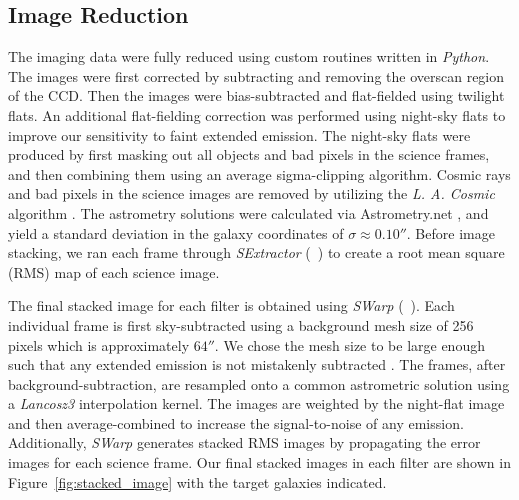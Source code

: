 \documentclass[twocolumn]{aastex62}
\newcommand{\citeth}[1]{(\citeauthor{#1}\ \citeyear{#1})}
\begin{document}
\subsection{Image Reduction}
The imaging data were fully reduced using custom routines written in \emph{Python}. 
The images were first corrected by subtracting and removing the overscan region of the CCD. 
Then the images were bias-subtracted and flat-fielded using twilight flats.
An additional flat-fielding correction was performed using night-sky flats to improve our sensitivity to faint extended emission.  The night-sky flats were produced by first masking out all objects and bad pixels in the science frames, and then combining them using an average sigma-clipping algorithm.
Cosmic rays and bad pixels in the science images are removed by utilizing the \emph{L. A. Cosmic} algorithm \citep{Dokkum2001}.
The astrometry solutions were calculated via Astrometry.net \citep{Lang}, and yield a standard deviation in the galaxy coordinates of $\sigma \approx 0.10''$. Before image stacking, we ran each frame through \emph{SExtractor} \citeth{Bertin} to create a root mean square (RMS) map of each science image.


The final stacked image for each filter is obtained using \emph{SWarp} \citeth{Bertin}.
Each individual frame is first sky-subtracted using a background mesh size of 256 pixels which is approximately $64''$. 
We chose the mesh size to be large enough such that any extended emission is not mistakenly subtracted \citep[e.g.,][]{Battaia_2015}. 
The frames, after background-subtraction, are resampled onto a common astrometric solution using a \textit{Lancosz3} interpolation kernel. 
The images are weighted by the night-flat image and then  average-combined to increase the signal-to-noise of any  emission. Additionally, \emph{SWarp} generates stacked RMS images by propagating the error images for each science frame.
Our final stacked images in each filter are shown in Figure~\ref{fig:stacked_image} with the target galaxies indicated.  
\end{document}
